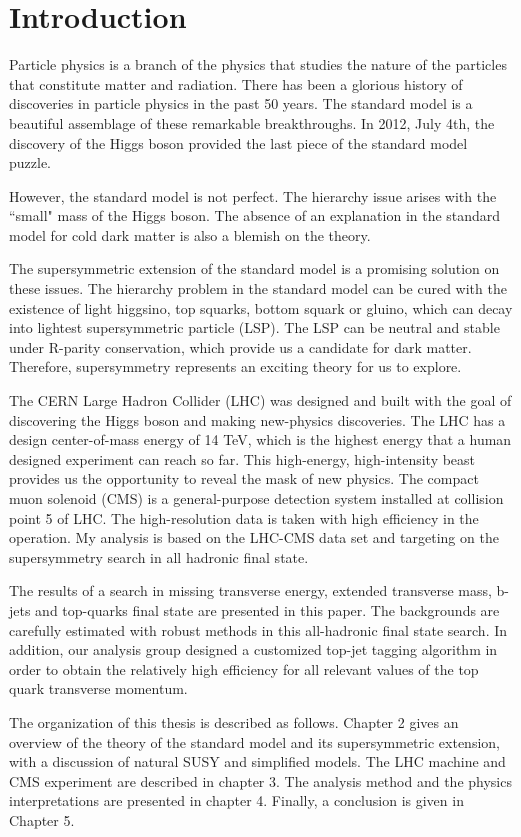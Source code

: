 \chapter{Introduction}
Particle physics is a branch of the physics that studies the nature of the particles that constitute matter and radiation. There has been a glorious history of discoveries in particle physics in the past 50 years. The standard model is a beautiful assemblage of these remarkable breakthroughs. In 2012, July 4th, the discovery of the Higgs boson provided the last piece of the standard model puzzle.

However, the standard model is not perfect. The hierarchy issue arises with the ``small" mass of the Higgs boson. The absence of an explanation in the standard model for cold dark matter is also a blemish on the theory.

The supersymmetric extension of the standard model is a promising solution on these issues. The hierarchy problem in the standard model can be cured with the existence of light higgsino, top squarks, bottom squark or gluino, which can decay into lightest supersymmetric particle (LSP). The LSP can be neutral and stable under R-parity conservation, which provide us a candidate for dark matter. Therefore, supersymmetry represents an exciting theory for us to explore.

The CERN Large Hadron Collider (LHC) was designed and built with the goal of discovering the Higgs boson and making new-physics discoveries. The LHC has a design center-of-mass energy of 14 TeV, which is the highest energy that a human designed experiment can reach so far. This high-energy, high-intensity beast provides us the opportunity to reveal the mask of new physics. The compact muon solenoid (CMS) is a general-purpose detection system installed at collision point 5 of LHC. The high-resolution data is taken with high efficiency in the operation. My analysis is based on the LHC-CMS data set and targeting on the supersymmetry search in all hadronic final state.

The results of a search in missing transverse energy, extended transverse mass, b-jets and top-quarks final state are presented in this paper. The backgrounds are carefully estimated with robust methods in this all-hadronic final state search. In addition, our analysis group designed a customized top-jet tagging algorithm in order to obtain the relatively high efficiency for all relevant values of the top quark transverse momentum.

The organization of this thesis is described as follows. Chapter 2 gives an overview of the theory of the standard model and its supersymmetric extension, with a discussion of natural SUSY and simplified models. The LHC machine and CMS experiment are described in chapter 3. The analysis method and the physics interpretations are presented in chapter 4. Finally, a conclusion is given in Chapter 5.

